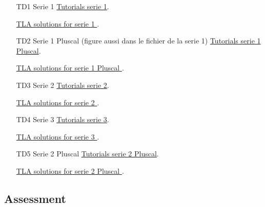 \documentclass[ 12pt]{article}
\begin{document}
\begin{enumerate}



  \item[TD1]   Serie  1
    \href{http://mery54.github.io/teaching/aspd/lecturesnotes/aspd-app-td1.pdf}{Tutorials 
      serie 1}.

        \href{http://mery54.github.io/teaching/aspd/models/tlatd1.zip}{TLA 
           solutions for serie 1
         }.

\item[TD2]   Serie 1  Pluscal (figure aussi dans le fichier de la serie 1)
    \href{http://mery54.github.io/teaching/aspd/lecturesnotes/aspd-app-pluscal1.pdf}{Tutorials 
      serie 1  Pluscal}.

        \href{http://mery54.github.io/teaching/aspd/models/tdpluscal.zip}{TLA 
           solutions for serie 1 Pluscal
         }.
         

         
\item[TD3]   Serie  2
    \href{http://mery54.github.io/teaching/aspd/lecturesnotes/aspd-app-td2.pdf}{Tutorials 
      serie 2}.

        \href{http://mery54.github.io/teaching/aspd/models/tlatd2.zip}{TLA 
           solutions for serie 2
         }.


         
\item[TD4]   Serie  3
    \href{http://mery54.github.io/teaching/aspd/lecturesnotes/aspd-app-td3.pdf}{Tutorials 
      serie 3}.

        \href{http://mery54.github.io/teaching/aspd/models/tlatd3.zip}{TLA 
           solutions for serie 3
         }.

\item[TD5]   Serie 2  Pluscal 
    \href{http://mery54.github.io/teaching/aspd/lecturesnotes/aspd-app-pluscal2.pdf}{Tutorials 
      serie 2 Pluscal}.

        \href{http://mery54.github.io/teaching/aspd/models/tdpluscal2.zip}{TLA 
           solutions for serie 2 Pluscal
         }.
                  
         \end{enumerate}

  
  
  \subsection{Assessment}
\label{sec:project}
\end{document}
